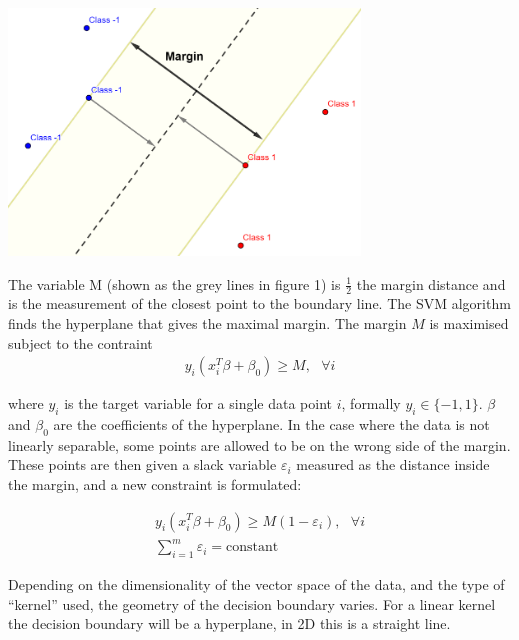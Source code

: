 \documentclass[a4paper,11pt,twoside]{article}
\begin{document}
\begin{center}
\includegraphics[width=0.7\textwidth]{SVM.png}

\end{center}

The variable M (shown as the grey lines in figure 1) is $\frac{1}{2}$ the margin distance and is the measurement of the closest point to the boundary line. The SVM algorithm finds the hyperplane that gives the maximal margin. The margin $M$ is maximised subject to the contraint
\begin{equation}
\begin{gathered}
y_i(x_i^T \beta+\beta_0)\geq M,\text{ } \forall i
\end{gathered}
\end{equation}

where $y_i$ is the target variable for a single data point $i$, formally $y_i \in \{-1, 1\}$. $\beta$ and $\beta_0$ are the coefficients of the hyperplane. In the case where the data is not linearly separable, some points are allowed to be on the wrong side of the margin. These points are then given a slack variable $\varepsilon_i$ measured as the distance inside the margin, and a new constraint is formulated:

\begin{equation}
\begin{gathered}
y_i(x_i^T \beta+\beta_0)\geq M(1-\varepsilon_i),\text{ } \forall i
\\
\sum_{i=1}^m\varepsilon_i = \text{constant}
\end{gathered}
\end{equation}

Depending on the dimensionality of the vector space of the data, and the type of “kernel” used, the geometry of the decision boundary varies. For a linear kernel the decision boundary will be a hyperplane, in 2D this is a straight line. 
\end{document}

